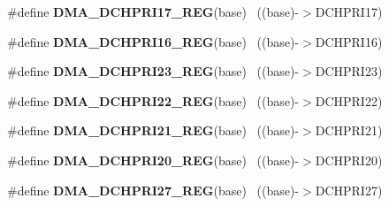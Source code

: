 \begin{DoxyCompactItemize}
\item 
\hypertarget{group___d_m_a___register___accessor___macros_ga03f82eb1303da9520ed3741ea5c987d9}{}\#define {\bfseries D\+M\+A\+\_\+\+D\+C\+H\+P\+R\+I17\+\_\+\+R\+E\+G}(base)                                  ~((base)-\/$>$D\+C\+H\+P\+R\+I17)\label{group___d_m_a___register___accessor___macros_ga03f82eb1303da9520ed3741ea5c987d9}

\item 
\hypertarget{group___d_m_a___register___accessor___macros_ga29297604f084f9c156bcf55ac436867d}{}\#define {\bfseries D\+M\+A\+\_\+\+D\+C\+H\+P\+R\+I16\+\_\+\+R\+E\+G}(base)                                  ~((base)-\/$>$D\+C\+H\+P\+R\+I16)\label{group___d_m_a___register___accessor___macros_ga29297604f084f9c156bcf55ac436867d}

\item 
\hypertarget{group___d_m_a___register___accessor___macros_gaae3b9d3d788e5da2728f49597cde8972}{}\#define {\bfseries D\+M\+A\+\_\+\+D\+C\+H\+P\+R\+I23\+\_\+\+R\+E\+G}(base)                                  ~((base)-\/$>$D\+C\+H\+P\+R\+I23)\label{group___d_m_a___register___accessor___macros_gaae3b9d3d788e5da2728f49597cde8972}

\item 
\hypertarget{group___d_m_a___register___accessor___macros_ga077bf6d8d409819850a6cc3570b036b7}{}\#define {\bfseries D\+M\+A\+\_\+\+D\+C\+H\+P\+R\+I22\+\_\+\+R\+E\+G}(base)                                  ~((base)-\/$>$D\+C\+H\+P\+R\+I22)\label{group___d_m_a___register___accessor___macros_ga077bf6d8d409819850a6cc3570b036b7}

\item 
\hypertarget{group___d_m_a___register___accessor___macros_ga509a808e9d1c23fcb23d072c4b005405}{}\#define {\bfseries D\+M\+A\+\_\+\+D\+C\+H\+P\+R\+I21\+\_\+\+R\+E\+G}(base)                                  ~((base)-\/$>$D\+C\+H\+P\+R\+I21)\label{group___d_m_a___register___accessor___macros_ga509a808e9d1c23fcb23d072c4b005405}

\item 
\hypertarget{group___d_m_a___register___accessor___macros_ga8c06ffc2ef1fdbdad7b18ef722624e83}{}\#define {\bfseries D\+M\+A\+\_\+\+D\+C\+H\+P\+R\+I20\+\_\+\+R\+E\+G}(base)                                  ~((base)-\/$>$D\+C\+H\+P\+R\+I20)\label{group___d_m_a___register___accessor___macros_ga8c06ffc2ef1fdbdad7b18ef722624e83}

\item 
\hypertarget{group___d_m_a___register___accessor___macros_ga13f3de7111c7dfc5a74299a5be709756}{}\#define {\bfseries D\+M\+A\+\_\+\+D\+C\+H\+P\+R\+I27\+\_\+\+R\+E\+G}(base)                                  ~((base)-\/$>$D\+C\+H\+P\+R\+I27)\label{group___d_m_a___register___accessor___macros_ga13f3de7111c7dfc5a74299a5be709756}


\end{DoxyCompactItemize}
